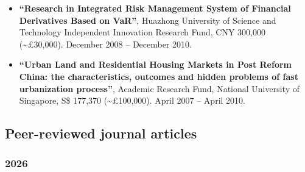 \documentclass[11pt,a4paper]{article}
\begin{document}
\begin{itemize}
  430,000 (\textasciitilde£43,000). January 2012 -- December 2015.
\item
  \textbf{``Research in Integrated Risk Management System of Financial
  Derivatives Based on VaR''}, Huazhong University of Science and
  Technology Independent Innovation Research Fund, CNY 300,000
  (\textasciitilde£30,000). December 2008 -- December 2010.
\item
  \textbf{``Urban Land and Residential Housing Markets in Post Reform
  China: the characteristics, outcomes and hidden problems of fast
  urbanization process''}, Academic Research Fund, National University
  of Singapore, S\$ 177,370 (\textasciitilde£100,000). April 2007 --
  April 2010.
\end{itemize}

\subsection{Peer-reviewed journal
articles}\label{peer-reviewed-journal-articles}

\subsubsection{2026}\label{section}
\end{document}
